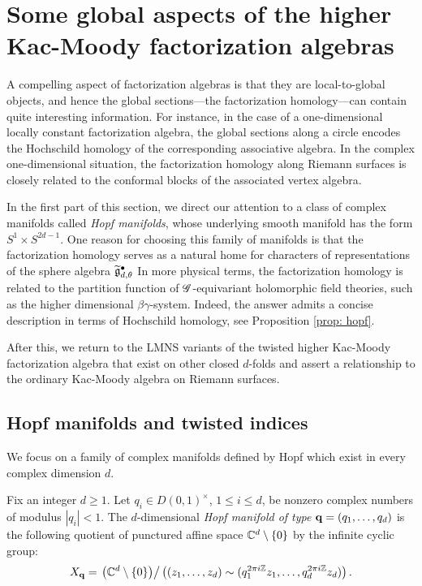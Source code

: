 \section{Some global aspects of the higher Kac-Moody factorization algebras}

A compelling aspect of factorization algebras is that they are local-to-global objects,
and hence the global sections---the factorization homology---can contain quite interesting information.
For instance, in the case of a one-dimensional locally constant factorization algebra, the global sections along a circle encodes the Hochschild homology of the corresponding associative algebra. 
In the complex one-dimensional situation, the factorization homology along Riemann surfaces is closely related to the conformal blocks of the associated vertex algebra. 

In the first part of this section, we direct our attention to a class of complex manifolds called {\em Hopf manifolds},
whose underlying smooth manifold has the form $S^1 \times S^{2d-1}$.
One reason for choosing this family of manifolds is that the factorization homology serves as a natural home for characters of representations of the sphere algebra $\widetilde{\mathfrak g}_{d,\theta}^\bullet$
In more physical terms, the factorization homology is related to the partition function of $\mathscr G$-equivariant holomorphic field theories, such as the higher dimensional $\beta\gamma$-system.
Indeed, the answer admits a concise description in terms of Hochschild homology, see Proposition \ref{prop: hopf}. 

After this, we return to the LMNS variants of the twisted higher Kac-Moody factorization algebra that exist on other closed $d$-folds and assert a relationship to the ordinary Kac-Moody algebra on Riemann surfaces. 

\subsection{Hopf manifolds and twisted indices}

We focus on a family of complex manifolds defined by Hopf \cite{Hopf} which exist in every complex dimension $d$. 

\begin{dfn}
Fix an integer $d \geq 1$. 
Let $q_i \in D(0,1)^{\times}$, $1 \leq i \leq d$, be nonzero complex numbers of modulus $|q_i| <1$. 
The $d$-dimensional {\em Hopf manifold of type} ${\bf q} = (q_1,\ldots,q_d)$ is the following quotient of punctured affine space $\mathbb C^d \setminus \{0\}$ by the infinite cyclic group:
\[
X_{\bf q} = \left. \left(\mathbb C^d \setminus \{0\}\right) \right/ \left( (z_1,\ldots,z_d) \sim (q_1^{2\pi i \mathbb Z} z_1, \ldots,q_d^{2 \pi i \mathbb Z} z_d) \right) .
\]
\end{dfn}

